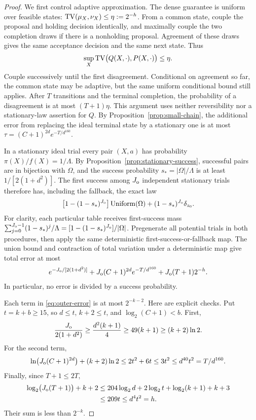 \begin{proof}
We first control adaptive approximation. The dense guarantee is uniform
over feasible states:
$\operatorname{TV}(\mu_X,\nu_X)\le\eta:=2^{-h}$.
From a common state, couple the proposal and holding decision identically,
and maximally couple the two completion draws if there is a nonholding
proposal. Agreement of these draws gives the same acceptance decision and
the same next state. Thus
\[
 \sup_X\operatorname{TV}\bigl(Q(X,\cdot),P(X,\cdot)\bigr)\le\eta.
\]
Couple successively until the first disagreement. Conditional on agreement
so far, the common state may be adaptive, but the same uniform conditional
bound still applies. After $T$ transitions and the terminal completion, the
probability of a disagreement is at most $(T+1)\eta$. This argument uses
neither reversibility nor a stationary-law assertion for $Q$.
By Proposition~\ref{prop:small-chain}, the additional error from replacing
the ideal terminal state by a stationary one is at most
$\tau=(C+1)^{2d}e^{-T/d^{160}}$.

In a stationary ideal trial every pair $(X,a)$ has probability
$\pi(X)/f(X)=1/\Lambda$. By Proposition~\ref{prop:stationary-success},
successful pairs are in bijection with $\Omega$, and the success probability
$s_*=|\Omega|/\Lambda$ is at least $1/[2(1+d^2)]$.
The first success among $J_{\rm o}$ independent stationary trials therefore
has, including the fallback, the exact law
\[
 \bigl[1-(1-s_*)^{J_{\rm o}}\bigr]
          \operatorname{Uniform}(\Omega)
       +(1-s_*)^{J_{\rm o}}\delta_{z_0}.
\]
For clarity, each particular table receives first-success mass
$\sum_{j=0}^{J_{\rm o}-1}(1-s_*)^j/\Lambda
=[1-(1-s_*)^{J_{\rm o}}]/|\Omega|$.
Pregenerate all potential trials in both procedures, then apply the same
deterministic first-success-or-fallback map. The union bound and contraction
of total variation under a deterministic map give total error at most
\begin{equation}\label{eq:outer-error}
 e^{-J_{\rm o}/[2(1+d^2)]}
 +J_{\rm o}(C+1)^{2d}e^{-T/d^{160}}
 +J_{\rm o}(T+1)2^{-h}.
\end{equation}
In particular, no error is divided by a success probability.

Each term in \eqref{eq:outer-error} is at most $2^{-k-2}$. Here are explicit
checks. Put $t=k+b\ge15$, so $d\le t$, $k+2\le t$, and
$\log_2(C+1)<b$. First,
\[
 \frac{J_{\rm o}}{2(1+d^2)}
 \ge\frac{d^2(k+1)}4\ge49(k+1)\ge(k+2)\ln2.
\]
For the second term,
\[
 \ln\bigl(J_{\rm o}(C+1)^{2d}\bigr)+(k+2)\ln2
 \le2t^2+6t\le3t^2\le d^{40}t^2=T/d^{160}.
\]
Finally, since $T+1\le2T$,
\begin{align*}
 \log_2\bigl(J_{\rm o}(T+1)\bigr)+k+2
 &\le204\log_2d+2\log_2t+\log_2(k+1)+k+3\\
 &\le209t\le d^4t^2=h.
\end{align*}
Their sum is less than $2^{-k}$.


\end{proof}
